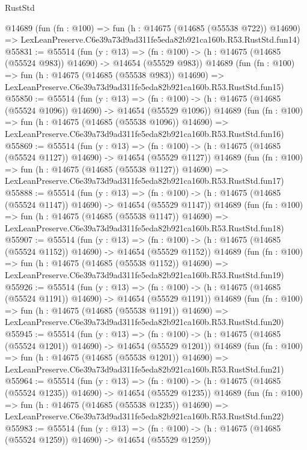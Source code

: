 \begin{lexlean}{RustStd}
\begin{coremodule}
    @14689
    (fun (fn : @100) =>
    fun (h : @14675 (@14685 (@55538 @722)) @14690) =>
    LexLeanPreserve.C6e39a73d9ad311fe5eda82b921ca160b.R53.RustStd.fun14)
@55831 := @55514
    (fun (y : @13) =>
    (fn : @100) -> (h : @14675 (@14685 (@55524 @983)) @14690) -> @14654 (@55529 @983))
    @14689
    (fun (fn : @100) =>
    fun (h : @14675 (@14685 (@55538 @983)) @14690) =>
    LexLeanPreserve.C6e39a73d9ad311fe5eda82b921ca160b.R53.RustStd.fun15)
@55850 := @55514
    (fun (y : @13) =>
    (fn : @100) -> (h : @14675 (@14685 (@55524 @1096)) @14690) -> @14654 (@55529 @1096))
    @14689
    (fun (fn : @100) =>
    fun (h : @14675 (@14685 (@55538 @1096)) @14690) =>
    LexLeanPreserve.C6e39a73d9ad311fe5eda82b921ca160b.R53.RustStd.fun16)
@55869 := @55514
    (fun (y : @13) =>
    (fn : @100) -> (h : @14675 (@14685 (@55524 @1127)) @14690) -> @14654 (@55529 @1127))
    @14689
    (fun (fn : @100) =>
    fun (h : @14675 (@14685 (@55538 @1127)) @14690) =>
    LexLeanPreserve.C6e39a73d9ad311fe5eda82b921ca160b.R53.RustStd.fun17)
@55888 := @55514
    (fun (y : @13) =>
    (fn : @100) -> (h : @14675 (@14685 (@55524 @1147)) @14690) -> @14654 (@55529 @1147))
    @14689
    (fun (fn : @100) =>
    fun (h : @14675 (@14685 (@55538 @1147)) @14690) =>
    LexLeanPreserve.C6e39a73d9ad311fe5eda82b921ca160b.R53.RustStd.fun18)
@55907 := @55514
    (fun (y : @13) =>
    (fn : @100) -> (h : @14675 (@14685 (@55524 @1152)) @14690) -> @14654 (@55529 @1152))
    @14689
    (fun (fn : @100) =>
    fun (h : @14675 (@14685 (@55538 @1152)) @14690) =>
    LexLeanPreserve.C6e39a73d9ad311fe5eda82b921ca160b.R53.RustStd.fun19)
@55926 := @55514
    (fun (y : @13) =>
    (fn : @100) -> (h : @14675 (@14685 (@55524 @1191)) @14690) -> @14654 (@55529 @1191))
    @14689
    (fun (fn : @100) =>
    fun (h : @14675 (@14685 (@55538 @1191)) @14690) =>
    LexLeanPreserve.C6e39a73d9ad311fe5eda82b921ca160b.R53.RustStd.fun20)
@55945 := @55514
    (fun (y : @13) =>
    (fn : @100) -> (h : @14675 (@14685 (@55524 @1201)) @14690) -> @14654 (@55529 @1201))
    @14689
    (fun (fn : @100) =>
    fun (h : @14675 (@14685 (@55538 @1201)) @14690) =>
    LexLeanPreserve.C6e39a73d9ad311fe5eda82b921ca160b.R53.RustStd.fun21)
@55964 := @55514
    (fun (y : @13) =>
    (fn : @100) -> (h : @14675 (@14685 (@55524 @1235)) @14690) -> @14654 (@55529 @1235))
    @14689
    (fun (fn : @100) =>
    fun (h : @14675 (@14685 (@55538 @1235)) @14690) =>
    LexLeanPreserve.C6e39a73d9ad311fe5eda82b921ca160b.R53.RustStd.fun22)
@55983 := @55514
    (fun (y : @13) =>
    (fn : @100) -> (h : @14675 (@14685 (@55524 @1259)) @14690) -> @14654 (@55529 @1259))

\end{coremodule}
\end{lexlean}
